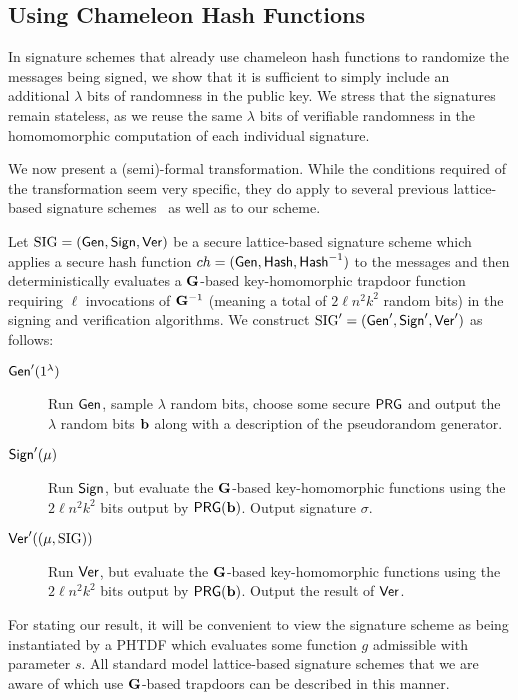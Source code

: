 \subsection{Using  Chameleon Hash Functions}
\label{sec:using-chameleon-hash}

In signature
schemes that already use chameleon hash functions to randomize the
messages being signed, we show that it is sufficient to
simply include an additional $\lambda$ bits of randomness in the
public key. 
We stress that the signatures remain stateless, as we
reuse the same $\lambda$ bits of verifiable randomness in the
homomomorphic computation of each individual signature. 

We now present a (semi)-formal transformation. 
While the conditions required
of the transformation seem very specific, they do apply to several
previous lattice-based signature
schemes~\cite{DBLP:conf/crypto/DucasM14,DBLP:conf/pkc/Alperin-Sheriff15}
as well as to our scheme.


Let $\text{SIG} = (\mathsf{Gen}, \mathsf{Sign}, \mathsf{Ver})$ be a secure
lattice-based signature scheme which applies a secure
hash function $ch=(\mathsf{Gen},\mathsf{Hash},\mathsf{Hash}^{-1})$ to the messages and then
deterministically evaluates a $\mathbf{G}$-based key-homomorphic trapdoor
function requiring $\ell$ invocations of $\mathbf{G}^{-1}$ (meaning a total
of $2\ell n^2k^2$ random bits) in the signing and verification
algorithms. We construct $\text{SIG}'=(\mathsf{Gen}',\mathsf{Sign}',\mathsf{Ver}')$ as
follows:

\begin{description}
\item[$\mathsf{Gen}'(1^\lambda)$] Run $\mathsf{Gen}$, sample $\lambda$ random
  bits, choose some secure
  $\mathsf{PRG}$ and
  output the $\lambda$ random bits $\mathbf{b}$ along with a description of the
  pseudorandom generator. 
\item[$\mathsf{Sign}'(\mu)$] Run $\mathsf{Sign}$, but evaluate the $\mathbf{G}$-based
  key-homomorphic functions using the $2\ell n^2 k^2$ bits output by
  $\mathsf{PRG}(\mathbf{b})$. Output signature $\sigma$.
\item[$\mathsf{Ver}'((\mu,\text{SIG}))$] Run $\mathsf{Ver}$, but evaluate the $\mathbf{G}$-based
  key-homomorphic functions using the $2\ell n^2 k^2$ bits output by
  $\mathsf{PRG}(\mathbf{b})$. Output the result of $\mathsf{Ver}$. 
\end{description}

For stating our result, it will be convenient to view the signature
scheme as being instantiated by a PHTDF which evaluates some
function $g$ admissible with parameter $s$. All standard model lattice-based
signature schemes that we are aware of which use $\mathbf{G}$-based
trapdoors can be described in this manner.

